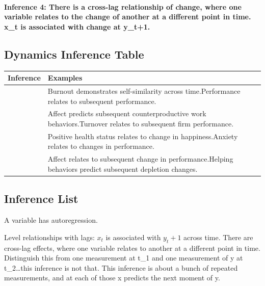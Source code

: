 \documentclass[english,,man]{apa6}
\let\oldparagraph\paragraph
\renewcommand{\paragraph}[1]{\oldparagraph{#1}\mbox{}}
\theoremstyle{definition}
\theoremstyle{definition}
\theoremstyle{definition}
\theoremstyle{remark}
\begin{document}
\hypertarget{inference-4-there-is-a-cross-lag-relationship-of-change-where-one-variable-relates-to-the-change-of-another-at-a-different-point-in-time.-x_t-is-associated-with-change-at-y_t1.}{%
\paragraph{Inference 4: There is a cross-lag relationship of change,
where one variable relates to the change of another at a different point
in time. x\_t is associated with change at
y\_t+1.}\label{inference-4-there-is-a-cross-lag-relationship-of-change-where-one-variable-relates-to-the-change-of-another-at-a-different-point-in-time.-x_t-is-associated-with-change-at-y_t1.}}

\hypertarget{dynamics-inference-table}{%
\subsection{Dynamics Inference Table}\label{dynamics-inference-table}}

\begin{tabular}{>{\raggedright\arraybackslash}p{5em}>{\raggedright\arraybackslash}p{30em}}
\toprule
Inference & Examples\\
\midrule
1 & Burnout demonstrates self-similarity across time.\newline Performance relates to subsequent performance.\\
\hline
2 & Affect predicts subsequent counterproductive work behaviors.\newline Turnover relates to subsequent firm performance.\\
\hline
3 & Positive health status relates to change in happiness.\newline Anxiety relates to changes in performance.\\
\hline
4 & Affect relates to subsequent change in performance.\newline Helping behaviors predict subsequent depletion changes.\\
\bottomrule
\end{tabular}

\hypertarget{inference-list}{%
\subsection{Inference List}\label{inference-list}}

A variable has autoregression.

Level relationships with lags: \(x_t\) is associated with \(y_t+1\)
across time. There are cross-lag effects, where one variable relates to
another at a different point in time. Distinguish this from one
measurement at t\_1 and one measurement of y at t\_2\ldots{}this
inference is not that. This inference is about a bunch of repeated
measurements, and at each of those x predicts the next moment of y.
\end{document}
